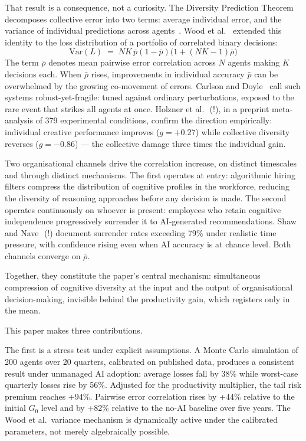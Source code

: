 \documentclass[11pt,a4paper]{article}
\begin{document}
That result is a consequence, not a curiosity. The Diversity Prediction Theorem
decomposes collective error into two terms: average individual error, and the
variance of individual predictions across
agents~\cite{page_princeton_2007,krogh_nips_1995}. Wood et
al.~\cite{wood_jmlr_2023} extended this identity to the loss distribution of a
portfolio of correlated binary decisions:
\[
  \text{Var}(L) \;=\; NK\,\bar{p}(1-\bar{p})\bigl(1+(NK-1)\bar{\rho}\bigr)
\]
The term $\bar{\rho}$ denotes mean pairwise error correlation across $N$ agents
making $K$ decisions each. When $\bar{\rho}$ rises, improvements in individual
accuracy $\bar{p}$ can be overwhelmed by the growing co-movement of errors.
Carlson and Doyle~\cite{carlson_prl_2000} call such systems robust-yet-fragile:
tuned against ordinary perturbations, exposed to the rare event that strikes
all agents at once. Holzner et al.~\cite{holzner_arxiv_2025}\,(!), in a
preprint meta-analysis of 379 experimental conditions, confirm the direction
empirically: individual creative performance improves ($g = +0.27$) while
collective diversity reverses ($g = -0.86$) --- the collective damage three
times the individual gain.

Two organisational channels drive the correlation increase, on distinct
timescales and through distinct mechanisms. The first operates at entry:
algorithmic hiring filters compress the distribution of cognitive profiles in
the workforce, reducing the diversity of reasoning approaches before any
decision is made. The second operates continuously on whoever is present:
employees who retain cognitive independence progressively surrender it to
AI-generated recommendations. Shaw and Nave~\cite{shaw_psyarxiv_2026}\,(!)
document surrender rates exceeding 79\% under realistic time pressure, with
confidence rising even when AI accuracy is at chance level. Both channels
converge on $\bar{\rho}$.

Together, they constitute the paper's central mechanism: simultaneous
compression of cognitive diversity at the input and the output of
organisational decision-making, invisible behind the productivity gain, which
registers only in the mean.

This paper makes three contributions.

The first is a stress test under explicit assumptions. A Monte Carlo simulation
of 200 agents over 20 quarters, calibrated on published data, produces a
consistent result under unmanaged AI adoption: average losses fall by 38\%
while worst-case quarterly losses rise by 56\%. Adjusted for the productivity
multiplier, the tail risk premium reaches +94\%. Pairwise error correlation
rises by +44\% relative to the initial $G_0$ level and by +82\% relative to
the no-AI baseline over five years. The Wood et
al.\ variance mechanism is dynamically active under the calibrated parameters,
not merely algebraically possible.
\end{document}
